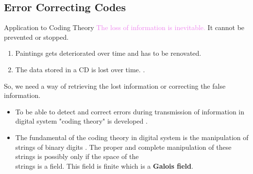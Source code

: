 \documentclass{beamer}
\begin{document}
\subsection{Error Correcting Codes}
\begin{frame}{Application to Coding Theory}
\textcolor{violet}{The loss of information is inevitable.} It cannot be prevented or stopped.
\begin{enumerate}

\item Paintings gets deteriorated over time and has to be renovated.
\item The data stored in a CD is lost over time. \cite{coding}.
\end{enumerate}
\vspace{3mm}

So, we need a way of retrieving the lost information or correcting the false information.
\vspace{2mm}

\begin{itemize}
\item  \textcolor{green!50!black}{To be able to detect and correct errors during transmission} of information in digital system "coding theory" is developed \cite{error_correct}.
  \vspace{1mm}

\item \textcolor{green!50!black}{The fundamental of the coding theory in digital system is the manipulation of strings of binary digits} \cite{error_correct}. The proper and complete manipulation of these strings is possibly only if the space of the \\
  strings is a field. This field is finite which is a \textbf{Galois field}.
  \end{itemize}
\end{frame}
\end{document}
